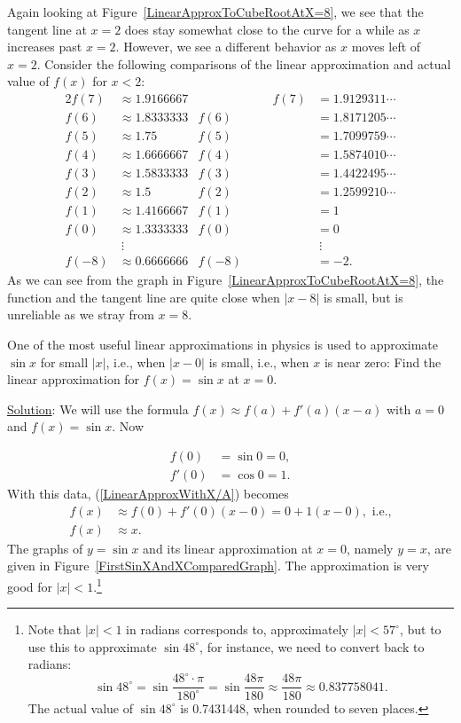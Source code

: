 Again looking at Figure~\ref{LinearApproxToCubeRootAtX=8},
we see that the tangent line at $x=2$ does stay somewhat close to the
curve for a while as $x$ increases past $x=2$.  However, we see a
different behavior as $x$ moves left of $x=2$.  Consider the 
following comparisons of the linear approximation and actual value
of $f(x)$ for $x<2$:
\begin{alignat*}{2}
f(7)&\approx1.9166667&\qquad\qquad\qquad 
                            f(7)&=1.9129311\cdots\\
f(6)&\approx1.8333333&      f(6)&=1.8171205\cdots\\
f(5)&\approx1.75     &      f(5)&=1.7099759\cdots\\
f(4)&\approx1.6666667&      f(4)&=1.5874010\cdots\\
f(3)&\approx1.5833333&      f(3)&=1.4422495\cdots\\
f(2)&\approx1.5      &      f(2)&=1.2599210\cdots\\
f(1)&\approx1.4166667&      f(1)&=1\\
f(0)&\approx1.3333333&      f(0)&=0\\
    &\ \vdots        &          &\ \vdots\\
f(-8)&\approx0.6666666&     f(-8)&=-2.
\end{alignat*}
As we can see from the graph in Figure~\ref{LinearApproxToCubeRootAtX=8},
the function and the tangent line are quite close when $|x-8|$ is
small, but is unreliable as we stray from $x=8$. 



One of the most useful linear approximations in physics
is used to approximate $\sin x$ for small $|x|$, i.e., when
$|x-0|$ is small, i.e., when $x$ is near zero:
\bex Find the linear approximation for $f(x)=\sin x$
     at $x=0$.

\underline{Solution}: We will use the formula
$f(x)\approx f(a)+f'(a)(x-a)$ with $a=0$ and $f(x)=\sin x$. Now

\begin{align*}
f(0)&=\sin 0=0,\\
f'(0)&=\cos 0=1.\end{align*}
With this data, (\ref{LinearApproxWithX/A}) becomes
\begin{align*}f(x)&\approx f(0)+f'(0)(x-0)=0+1(x-0), \text{ i.e.,}\\
              f(x)&\approx x.\end{align*}
The graphs of $y=\sin x$ and its linear approximation at 
$x=0$, namely $y=x$, are given in 
Figure~\ref{FirstSinXAndXComparedGraph}. The approximation 
is very good for $|x|<1$.\footnote{%
Note that $|x|<1$ in radians corresponds to, approximately $|x|<57^\circ$,
but to use this to approximate $\sin48^\circ$, for instance, we
need to convert back to radians:
$$\sin48^\circ=\sin\frac{48^\circ\cdot\pi}{180^\circ}
=\sin\frac{48\pi}{180}\approx\frac{48\pi}{180}\approx0.837758041.$$
The actual value of $\sin48^\circ$ is 0.7431448, when rounded to seven
places.
} 

